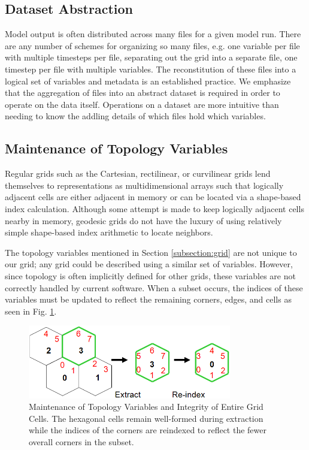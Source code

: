 \subsection{Dataset Abstraction}

Model output is often distributed across many files for a given model run.
There are any number of schemes for organizing so many files, e.g. one variable
per file with multiple timesteps per file, separating out the grid into a
separate file, one timestep per file with multiple variables.  The
reconstitution of these files into a logical set of variables and metadata is
an established practice\cite{NcML,THREDDS}.  We emphasize that the aggregation
of files into an abstract dataset is required in order to operate on the data
itself.  Operations on a dataset are more intuitive than needing to know the
addling details of which files hold which variables.

\subsection{Maintenance of Topology Variables}

Regular grids such as the Cartesian, rectilinear, or curvilinear grids lend
themselves to representations as multidimensional arrays such that logically
adjacent cells are either adjacent in memory or can be located via a
shape-based index calculation.  Although some attempt is made to keep
logically adjacent cells nearby in memory, geodesic grids do not have the
luxury of using relatively simple shape-based index arithmetic to locate
neighbors.

The topology variables mentioned in Section \ref{subsection:grid} are not
unique to our grid; any grid could be described using a similar set of
variables.  However, since topology is often implicitly defined for other
grids, these variables are not correctly handled by current software.  When a
subset occurs, the indices of these variables must be updated to reflect the
remaining corners, edges, and cells as seen in Fig. \ref{fig:subset}.

\begin{figure}[!t]
\center
\includegraphics[width=3.5in]{images/Subset0}
\caption{Maintenance of Topology Variables and Integrity of Entire Grid Cells.
The hexagonal cells remain well-formed during extraction while the indices of
the corners are reindexed to reflect the fewer overall corners in the subset.}
\label{fig:subset}
\end{figure}

